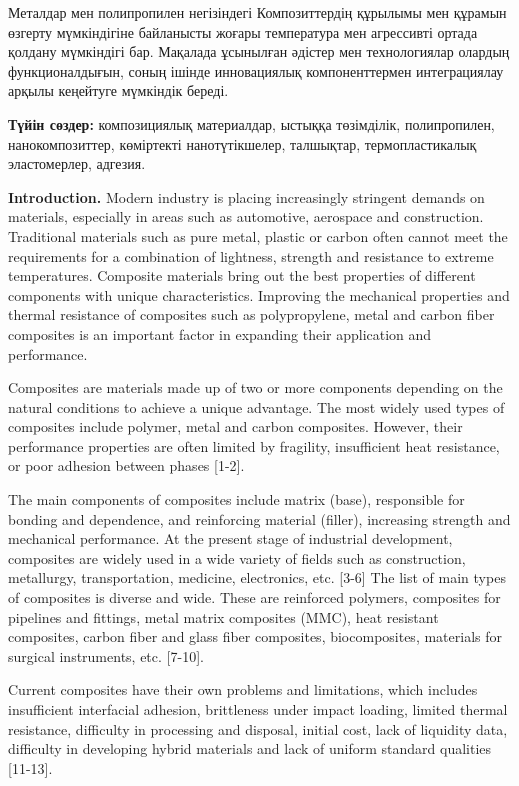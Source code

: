 Металдар мен полипропилен негізіндегі Композиттердің құрылымы мен
құрамын өзгерту мүмкіндігіне байланысты жоғары температура мен
агрессивті ортада қолдану мүмкіндігі бар. Мақалада ұсынылған әдістер мен
технологиялар олардың функционалдығын, соның ішінде инновациялық
компоненттермен интеграциялау арқылы кеңейтуге мүмкіндік береді.

{\bfseries Түйін сөздер:} композициялық материалдар, ыстыққа төзімділік,
полипропилен, нанокомпозиттер, көміртекті нанотүтікшелер, талшықтар,
термопластикалық эластомерлер, адгезия.

\begin{multicols}{2}
{\bfseries Introduction.} Modern industry is placing increasingly stringent
demands on materials, especially in areas such as automotive, aerospace
and construction. Traditional materials such as pure metal, plastic or
carbon often cannot meet the requirements for a combination of
lightness, strength and resistance to extreme temperatures. Composite
materials bring out the best properties of different components with
unique characteristics. Improving the mechanical properties and thermal
resistance of composites such as polypropylene, metal and carbon fiber
composites is an important factor in expanding their application and
performance.

Composites are materials made up of two or more components depending on
the natural conditions to achieve a unique advantage. The most widely
used types of composites include polymer, metal and carbon composites.
However, their performance properties are often limited by fragility,
insufficient heat resistance, or poor adhesion between phases {[}1-2{]}.

The main components of composites include matrix (base), responsible for
bonding and dependence, and reinforcing material (filler), increasing
strength and mechanical performance. At the present stage of industrial
development, composites are widely used in a wide variety of fields such
as construction, metallurgy, transportation, medicine, electronics, etc.
{[}3-6{]} The list of main types of composites is diverse and wide.
These are reinforced polymers, composites for pipelines and fittings,
metal matrix composites (MMC), heat resistant composites, carbon fiber
and glass fiber composites, biocomposites, materials for surgical
instruments, etc. {[}7-10{]}.

Current composites have their own problems and limitations, which
includes insufficient interfacial adhesion, brittleness under impact
loading, limited thermal resistance, difficulty in processing and
disposal, initial cost, lack of liquidity data, difficulty in developing
hybrid materials and lack of uniform standard qualities {[}11-13{]}.


\end{multicols}
